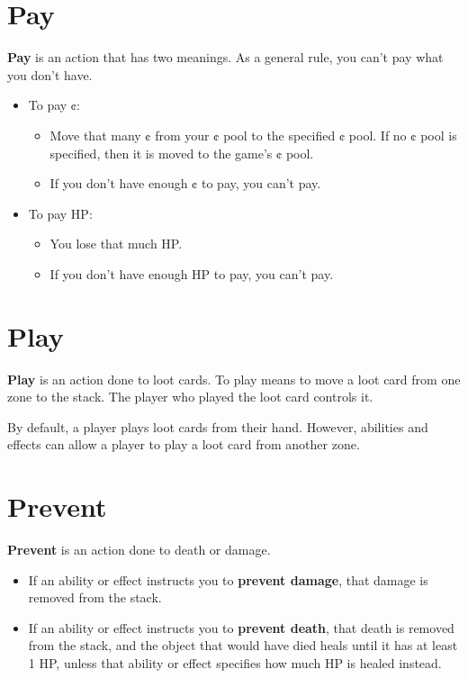 \documentclass[a4paper, twoside]{report} %
\begin{document}
    \section{Pay}
    \textbf{Pay} is an action that has two meanings. As a general rule, you can’t pay what you don’t have.
    \begin{itemize}
        \item To pay ¢:
        \begin{itemize}
            \item Move that many ¢ from your ¢ pool to the specified ¢ pool. If no ¢ pool is specified, then it is moved to the game’s ¢ pool.
            \item If you don’t have enough ¢ to pay, you can’t pay.
        \end{itemize}
        \item To pay HP: 
        \begin{itemize}
            \item You lose that much HP.
            \item If you don’t have enough HP to pay, you can’t pay.
        \end{itemize}
    \end{itemize}
    \section{Play}
    \textbf{Play} is an action done to loot cards. To play means to move a loot card from one zone to the stack. The player who played the loot card controls it.

    By default, a player plays loot cards from their hand. However, abilities and effects can allow a player to play a loot card from another zone.
    \section{Prevent}
    \textbf{Prevent} is an action done to death or damage.

    \begin{itemize}
        \item If an ability or effect instructs you to \textbf{prevent damage}, that damage is removed from the stack.
        \item If an ability or effect instructs you to \textbf{prevent death}, that death is removed from the stack, and the object that would have died heals until it has at least 1 HP, unless that ability or effect specifies how much HP is healed instead.
    \end{itemize}
\end{document}
